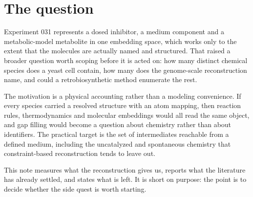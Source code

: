 
\section{The question}
\label{sec:question}

Experiment 031 represents a dosed inhibitor, a medium component and a metabolic-model
metabolite in one embedding space, which works only to the extent that the molecules are
actually named and structured. That raised a broader question worth scoping before it is
acted on: how many distinct chemical species does a yeast cell contain, how many does the
genome-scale reconstruction name, and could a retrobiosynthetic method enumerate the rest.

The motivation is a physical accounting rather than a modeling convenience. If every species
carried a resolved structure with an atom mapping, then reaction rules, thermodynamics and
molecular embeddings would all read the same object, and gap filling would become a question
about chemistry rather than about identifiers. The practical target is the set of
intermediates reachable from a defined medium, including the uncatalyzed and spontaneous
chemistry that constraint-based reconstruction tends to leave out.

This note measures what the reconstruction gives us, reports what the literature has already
settled, and states what is left. It is short on purpose: the point is to decide whether the
side quest is worth starting.
